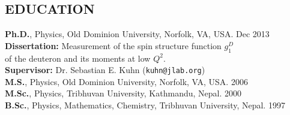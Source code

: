 \documentclass[line,margin]{res}
\begin{document}
\address{7 Dorsey Rd Apt D, Newport News VA, 23606}
\address{(757) 839 8594; \texttt{kadhi001@odu.edu}}

 
\begin{resume}
 
 
 
\section{EDUCATION} %
    \textbf{Ph.D.}, Physics, Old Dominion University, Norfolk, VA, USA.  \hfill Dec 2013\\
       \hspace*{5 mm} \textbf{Dissertation:} Measurement of the spin structure function $g^D_{1}$ \\
       \hspace*{10 mm} of the deuteron and its moments at low $Q^2$. \\
       \hspace*{5 mm} \textbf{Supervisor:} Dr. Sebastian E. Kuhn (\texttt{kuhn@jlab.org}) \\
    \textbf{M.S.}, Physics, Old Dominion University, Norfolk, VA, USA. \hfill 2006 \\ 
    \textbf{M.Sc.}, Physics, Tribhuvan University, Kathmandu, Nepal. \hfill 2000 \\ 
    \textbf{B.Sc.}, Physics, Mathematics, Chemistry, Tribhuvan University, Nepal. \hfill 1997 %



\end{resume}
\end{document}
